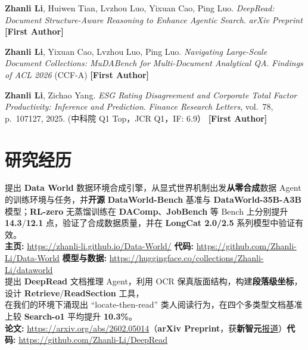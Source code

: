 \documentclass{resume}
\begin{document}
\textbf{Zhanli Li}, Huiwen Tian, Lvzhou Luo, Yixuan Cao, Ping Luo. \textit{DeepRead: Document Structure-Aware Reasoning to Enhance Agentic Search}. \textit{arXiv Preprint} \quad \textbf{[First Author]}

\textbf{Zhanli Li}, Yixuan Cao, Lvzhou Luo, Ping Luo. \textit{Navigating Large-Scale Document Collections: MuDABench for Multi-Document Analytical QA}. \textit{Findings of ACL 2026} (CCF-A) \quad \textbf{[First Author]}
 
\textbf{Zhanli Li}, Zichao Yang. \textit{ESG Rating Disagreement and Corporate Total Factor Productivity: Inference and Prediction}. \textit{Finance Research Letters}, vol.~78, p.~107127, 2025. (中科院 Q1 Top，JCR Q1，IF: 6.9） \quad \textbf{[First Author]}

\section{研究经历}

提出 \textbf{Data World} 数据环境合成引擎，从显式世界机制出发\textbf{从零合成}数据 Agent 的训练环境与任务，并\textbf{开源} \textbf{DataWorld-Bench} 基准与 \textbf{DataWorld-35B-A3B} 模型；\textbf{RL-zero} 无蒸馏训练在 \textbf{DAComp}、\textbf{JobBench} 等 Bench 上分别提升 \textbf{14.3}/\textbf{12.1} 点，验证了合成数据质量，并在 \textbf{LongCat 2.0/2.5} 系列模型中验证有效。\\[-2pt]
{\scriptsize \textbf{主页:} \url{https://zhanli-li.github.io/Data-World/} \quad \textbf{代码:} \url{https://github.com/Zhanli-Li/Data-World} \quad \textbf{模型与数据:} \url{https://huggingface.co/collections/Zhanli-Li/dataworld}}\\[-6pt]

提出 \textbf{DeepRead} 文档推理 Agent，利用 OCR 保真版面结构，构建\textbf{段落级坐标}，设计 \textbf{Retrieve}/\textbf{ReadSection} 工具，\\
在我们的环境下涌现出 ``locate-then-read'' 类人阅读行为，在四个多类型文档基准上较 \textbf{Search-o1} 平均提升 \textbf{10.3\%}。\\
{\scriptsize \textbf{论文:} \url{https://arxiv.org/abs/2602.05014}（\textbf{arXiv Preprint}，获\textbf{新智元}\href{https://mp.weixin.qq.com/s/BhvUQgREp4NOvb6axiWXiQ}{报道}）\quad \textbf{代码:} \url{https://github.com/Zhanli-Li/DeepRead}}\\[-6pt]
\end{document}
